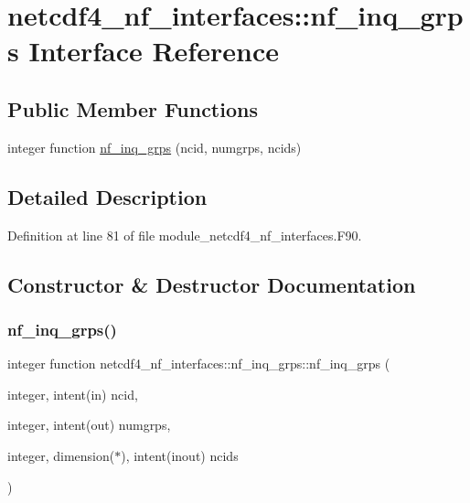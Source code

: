 \hypertarget{interfacenetcdf4__nf__interfaces_1_1nf__inq__grps}{}\section{netcdf4\+\_\+nf\+\_\+interfaces\+:\+:nf\+\_\+inq\+\_\+grps Interface Reference}
\label{interfacenetcdf4__nf__interfaces_1_1nf__inq__grps}
\subsection*{Public Member Functions}
\begin{DoxyCompactItemize}
\item 
integer function \hyperlink{interfacenetcdf4__nf__interfaces_1_1nf__inq__grps_aca730dd1e67713b62cadad1bc1bc2470}{nf\+\_\+inq\+\_\+grps} (ncid, numgrps, ncids)
\end{DoxyCompactItemize}


\subsection{Detailed Description}


Definition at line 81 of file module\+\_\+netcdf4\+\_\+nf\+\_\+interfaces.\+F90.



\subsection{Constructor \& Destructor Documentation}
\mbox{\label{interfacenetcdf4__nf__interfaces_1_1nf__inq__grps_aca730dd1e67713b62cadad1bc1bc2470}} 
\subsubsection{\texorpdfstring{nf\+\_\+inq\+\_\+grps()}{nf\_inq\_grps()}}
{\footnotesize\ttfamily integer function netcdf4\+\_\+nf\+\_\+interfaces\+::nf\+\_\+inq\+\_\+grps\+::nf\+\_\+inq\+\_\+grps (\begin{DoxyParamCaption}\item[{integer, intent(in)}]{ncid,  }\item[{integer, intent(out)}]{numgrps,  }\item[{integer, dimension($\ast$), intent(inout)}]{ncids }\end{DoxyParamCaption})}



